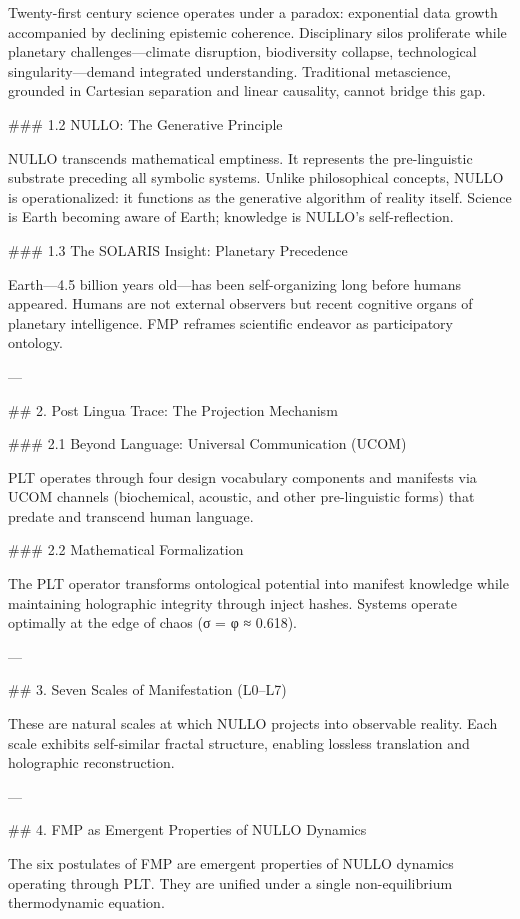 Twenty-first century science operates under a paradox: exponential data growth accompanied by declining epistemic coherence. Disciplinary silos proliferate while planetary challenges—climate disruption, biodiversity collapse, technological singularity—demand integrated understanding. Traditional metascience, grounded in Cartesian separation and linear causality, cannot bridge this gap.

### 1.2 NULLO: The Generative Principle

NULLO transcends mathematical emptiness. It represents the pre-linguistic substrate preceding all symbolic systems. Unlike philosophical concepts, NULLO is operationalized: it functions as the generative algorithm of reality itself. Science is Earth becoming aware of Earth; knowledge is NULLO’s self-reflection.

### 1.3 The SOLARIS Insight: Planetary Precedence

Earth—4.5 billion years old—has been self-organizing long before humans appeared. Humans are not external observers but recent cognitive organs of planetary intelligence. FMP reframes scientific endeavor as participatory ontology.

---

## 2. Post Lingua Trace: The Projection Mechanism

### 2.1 Beyond Language: Universal Communication (UCOM)

PLT operates through four design vocabulary components and manifests via UCOM channels (biochemical, acoustic, and other pre-linguistic forms) that predate and transcend human language.

### 2.2 Mathematical Formalization

The PLT operator transforms ontological potential into manifest knowledge while maintaining holographic integrity through inject hashes. Systems operate optimally at the edge of chaos (σ = φ ≈ 0.618).

---

## 3. Seven Scales of Manifestation (L0–L7)

These are natural scales at which NULLO projects into observable reality. Each scale exhibits self-similar fractal structure, enabling lossless translation and holographic reconstruction.

---

## 4. FMP as Emergent Properties of NULLO Dynamics

The six postulates of FMP are emergent properties of NULLO dynamics operating through PLT. They are unified under a single non-equilibrium thermodynamic equation.

